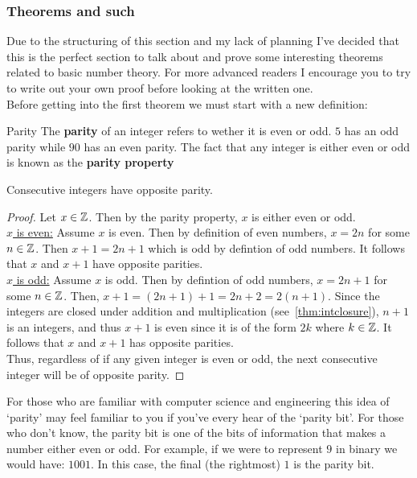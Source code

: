 \subsubsection{Theorems and such}
Due to the structuring of this section and my lack of planning I've decided that this is the perfect section to talk about and prove some interesting theorems related to basic number theory. For more advanced readers I encourage you to try to write out your own proof before looking at the written one. \\
Before getting into the first theorem we must start with a new definition:
\begin{definition}{Parity}{}
    The \textbf{parity} of an integer refers to wether it is even or odd. $5$ has an odd parity while $90$ has an even parity.
    The fact that any integer is either even or odd is known as the \textbf{parity property}
\end{definition}

\begin{thm}{}
        Consecutive integers have opposite parity.
    \begin{proof}
        Let $x \in \mathbb Z$. Then by the parity property, $x$ is either even or odd. \\
        \hspace*{2em}\underline{$x$ is even:} Assume $x$ is even. Then by definition of even numbers, $x = 2n$ for some $n \in \mathbb Z$. Then $x+1 = 2n+1$ which is odd by defintion of odd numbers. It follows that $x$ and $x+1$ have opposite parities.  \\
        \hspace*{2em}\underline{$x$ is odd:} Assume $x$ is odd. Then by defintion of odd numbers, $x = 2n+1$ for some $n\in\mathbb Z$. Then, $x+1 = (2n + 1) + 1 = 2n + 2 = 2(n + 1)$. Since the integers are closed under addition and multiplication (see~\ref{thm:intclosure}), $n+1$ is an integers, and thus $x+1$ is even since it is of the form $2k$ where $k \in \mathbb Z$. It follows that $x$ and $x+1$ has opposite parities. \\
        Thus, regardless of if any given integer is even or odd, the next consecutive integer will be of opposite parity.
    \end{proof}
\end{thm}

For those who are familiar with computer science and engineering this idea of `parity' may feel familiar to you if you've every hear of the `parity bit'. For those who don't know, the parity bit is one of the bits of information that makes a number either even or odd. For example, if we were to represent $9$ in binary we would have: $1001$. In this case, the final (the rightmost) $1$ is the parity bit.


